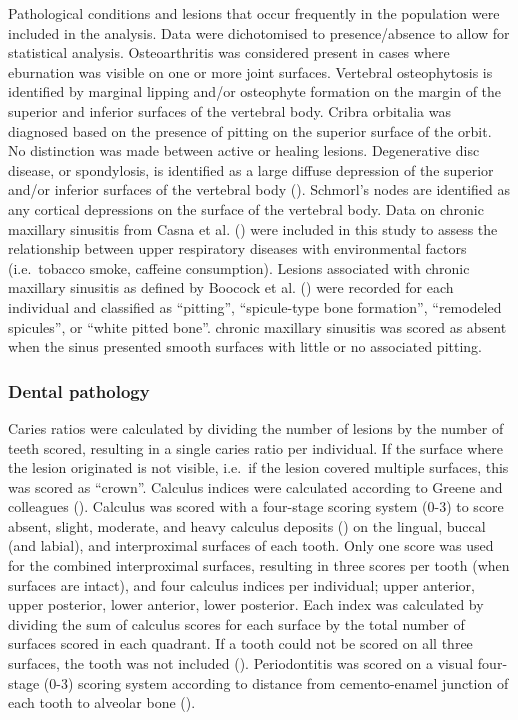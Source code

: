 \documentclass[
  b5paper,
]{book}
\begin{document}
Pathological conditions and lesions that occur frequently in the
population were included in the analysis. Data were dichotomised to
presence/absence to allow for statistical analysis. Osteoarthritis was
considered present in cases where eburnation was visible on one or more
joint surfaces. Vertebral osteophytosis is identified by marginal
lipping and/or osteophyte formation on the margin of the superior and
inferior surfaces of the vertebral body. Cribra orbitalia was diagnosed
based on the presence of pitting on the superior surface of the orbit.
No distinction was made between active or healing lesions. Degenerative
disc disease, or spondylosis, is identified as a large diffuse
depression of the superior and/or inferior surfaces of the vertebral
body ().
Schmorl's nodes are identified as any cortical depressions on the
surface of the vertebral body. Data on chronic maxillary sinusitis from
Casna et al. ()
were included in this study to assess the relationship between upper
respiratory diseases with environmental factors (i.e.~tobacco smoke,
caffeine consumption). Lesions associated with chronic maxillary
sinusitis as defined by Boocock et al.
() were recorded for
each individual and classified as ``pitting'', ``spicule-type bone
formation'', ``remodeled spicules'', or ``white pitted bone''. chronic
maxillary sinusitis was scored as absent when the sinus presented smooth
surfaces with little or no associated pitting.

\subsubsection{Dental pathology}\label{dental-pathology}

Caries ratios were calculated by dividing the number of lesions by the
number of teeth scored, resulting in a single caries ratio per
individual. If the surface where the lesion originated is not visible,
i.e.~if the lesion covered multiple surfaces, this was scored as
``crown''. Calculus indices were calculated according to Greene and
colleagues ().
Calculus was scored with a four-stage scoring system (0-3) to score
absent, slight, moderate, and heavy calculus deposits
() on the
lingual, buccal (and labial), and interproximal surfaces of each tooth.
Only one score was used for the combined interproximal surfaces,
resulting in three scores per tooth (when surfaces are intact), and four
calculus indices per individual; upper anterior, upper posterior, lower
anterior, lower posterior. Each index was calculated by dividing the sum
of calculus scores for each surface by the total number of surfaces
scored in each quadrant. If a tooth could not be scored on all three
surfaces, the tooth was not included
().
Periodontitis was scored on a visual four-stage (0-3) scoring system
according to distance from cemento-enamel junction of each tooth to
alveolar bone ().
\end{document}
